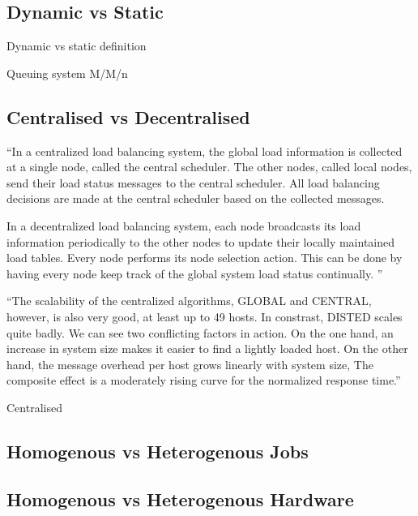 \documentclass[a4paper,12pt,oldfontcommands]{memoir}
\begin{document}
\subsection{Dynamic vs Static}


\cite{alakeel2010guide}

Dynamic vs static definition
\cite{1702040}

\cite{Anshelevich:2002:SLB:509907.509968}

Queuing system M/M/n

\cite{121756}

\subsection{Centralised vs Decentralised}

``In a centralized load balancing system, the global load information is collected at a single node, called the central scheduler. The other nodes, called local nodes, send their load status messages to the central scheduler. All load balancing decisions are made at the central scheduler based on the collected messages.

In a decentralized load balancing system, each node broadcasts its load information periodically to the other nodes to update their locally maintained load tables. Every node performs its node selection action. This can be done by having every node keep track of the global system load status continually.
''
\cite{472412}

``The scalability of the centralized algorithms,
GLOBAL and CENTRAL, however, is also
very good, at least up to 49 hosts. In constrast, DISTED
scales quite badly. We can see two conflicting factors in
action. On the one hand, an increase in system size makes
it easier to find a lightly loaded host. On the other hand,
the message overhead per host grows linearly with system
size, The composite effect is a moderately rising curve for
the normalized response time.''
\cite{6176}


Centralised 
\cite{121756}


\subsection{Homogenous vs Heterogenous Jobs}



\subsection{Homogenous vs Heterogenous Hardware}
\end{document}
